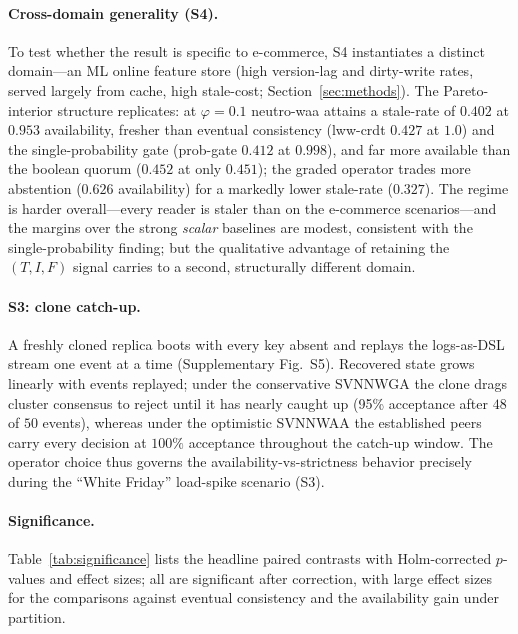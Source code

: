 \documentclass[fleqn,10pt]{wlscirep}
\begin{document}
\paragraph{Cross-domain generality (S4).} To test whether the result is specific to e-commerce, S4
instantiates a distinct domain---an ML online feature store (high version-lag and dirty-write rates,
served largely from cache, high stale-cost; Section~\ref{sec:methods}). The Pareto-interior structure
replicates: at $\varphi=0.1$ neutro-waa attains a stale-rate of $0.402$ at $0.953$ availability, fresher
than eventual consistency (lww-crdt $0.427$ at $1.0$) and the single-probability gate (prob-gate $0.412$
at $0.998$), and far more available than the boolean quorum ($0.452$ at only $0.451$); the graded operator
trades more abstention ($0.626$ availability) for a markedly lower stale-rate ($0.327$). The regime is
harder overall---every reader is staler than on the e-commerce scenarios---and the margins over the strong
\emph{scalar} baselines are modest, consistent with the single-probability finding; but the qualitative
advantage of retaining the $(T,I,F)$ signal carries to a second, structurally different domain.

\paragraph{S3: clone catch-up.} A freshly cloned replica boots with every key absent and replays
the logs-as-DSL stream one event at a time (Supplementary Fig.~S5). Recovered state grows linearly
with events replayed; under the conservative SVNNWGA the clone drags cluster consensus to reject
until it has nearly caught up (95\% acceptance after $48$ of $50$ events), whereas under the
optimistic SVNNWAA the established peers carry every decision at $100\%$ acceptance throughout the
catch-up window. The operator choice thus governs the availability-vs-strictness behavior precisely
during the ``White Friday'' load-spike scenario (S3).

\paragraph{Significance.} Table~\ref{tab:significance} lists the headline paired contrasts with
Holm-corrected $p$-values and effect sizes; all are significant after correction, with large effect
sizes for the comparisons against eventual consistency and the availability gain under partition.


\end{document}
